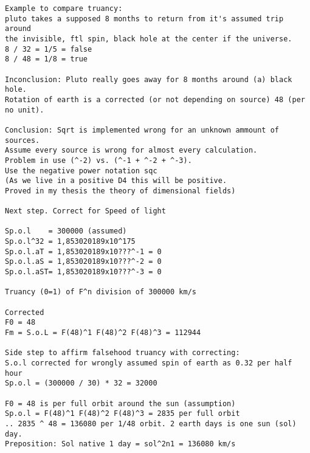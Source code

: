 \documentclass{article}
\begin{document}
\begin{verbatim}
Example to compare truancy:
pluto takes a supposed 8 months to return from it's assumed trip around 
the invisible, ftl spin, black hole at the center if the universe.
8 / 32 = 1/5 = false
8 / 48 = 1/8 = true

Inconclusion: Pluto really goes away for 8 months around (a) black hole.
Rotation of earth is a corrected (or not depending on source) 48 (per no unit).

Conclusion: Sqrt is implemented wrong for an unknown ammount of sources. 
Assume every source is wrong for almost every calculation.
Problem in use (^-2) vs. (^-1 + ^-2 + ^-3). 
Use the negative power notation sqc 
(As we live in a positive D4 this will be positive. 
Proved in my thesis the theory of dimensional fields)

Next step. Correct for Speed of light
 
Sp.o.l    = 300000 (assumed)
Sp.o.l^32 = 1,853020189x10^175
Sp.o.l.aT = 1,853020189x10???^-1 = 0
Sp.o.l.aS = 1,853020189x10???^-2 = 0
Sp.o.l.aST= 1,853020189x10???^-3 = 0

Truancy (0=1) of F^n division of 300000 km/s

Corrected
F0 = 48
Fm = S.o.L = F(48)^1 F(48)^2 F(48)^3 = 112944

Side step to affirm falsehood truancy with correcting:
S.o.l corrected for wrongly assumed spin of earth as 0.32 per half hour
Sp.o.l = (300000 / 30) * 32 = 32000

F0 = 48 is per full orbit around the sun (assumption)
Sp.o.l = F(48)^1 F(48)^2 F(48)^3 = 2835 per full orbit 
.. 2835 ^ 48 = 136080 per 1/48 orbit. 2 earth days is one sun (sol) day.
Preposition: Sol native 1 day = sol^2n1 = 136080 km/s   
\end{verbatim}
\end{document}
